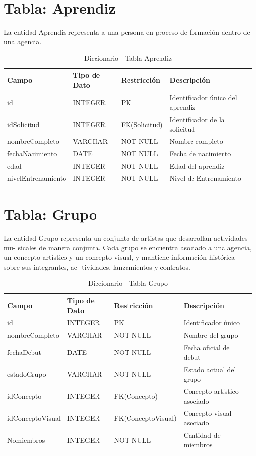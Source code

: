 \documentclass[12pt,a4paper,spanish,oneside]{report}
\begin{document}
\section{Tabla: Aprendiz}
La entidad Aprendiz representa a una persona en proceso de formación dentro de una agencia.
\begin{table}[H]
\centering
\caption{Diccionario - Tabla Aprendiz}
\begin{tabular}{|l|l|l|l|l|}
\hline
\textbf{Campo} & \textbf{Tipo de Dato}  & \textbf{Restricción} & \textbf{Descripción} \\
\hline
id & INTEGER & PK & Identificador único del aprendiz \\
\hline
idSolicitud & INTEGER & FK(Solicitud) & Identificador de la solicitud \\
\hline
nombreCompleto & VARCHAR & NOT NULL & Nombre completo \\
\hline
fechaNacimiento & DATE & NOT NULL & Fecha de nacimiento \\
\hline
edad & INTEGER & NOT NULL & Edad del aprendiz \\
\hline
nivelEntrenamiento & INTEGER & NOT NULL & Nivel de Entrenamiento \\
\hline
\end{tabular}
\end{table}

\section{Tabla: Grupo}
La entidad Grupo representa un conjunto de artistas que desarrollan actividades mu-
sicales de manera conjunta. Cada grupo se encuentra asociado a una agencia, un concepto
artístico y un concepto visual, y mantiene información histórica sobre sus integrantes, ac-
tividades, lanzamientos y contratos.

\begin{table}[H]
\centering
\caption{Diccionario - Tabla Grupo}
\begin{tabular}{|l|l|l|l|l|}
\hline
\textbf{Campo} & \textbf{Tipo de Dato} & \textbf{Restricción} & \textbf{Descripción} \\
\hline
id & INTEGER & PK & Identificador único \\
\hline
nombreCompleto & VARCHAR & NOT NULL & Nombre del grupo \\
\hline
fechaDebut & DATE & NOT NULL & Fecha oficial de debut \\
\hline
estadoGrupo & VARCHAR & NOT NULL & Estado actual del grupo \\
\hline
idConcepto & INTEGER & FK(Concepto) & Concepto artístico asociado \\
\hline
idConceptoVisual & INTEGER & FK(ConceptoVisual) & Concepto visual asociado \\
\hline
Nomiembros & INTEGER & NOT NULL & Cantidad de miembros \\
\hline
\end{tabular}
\end{table}
\end{document}
